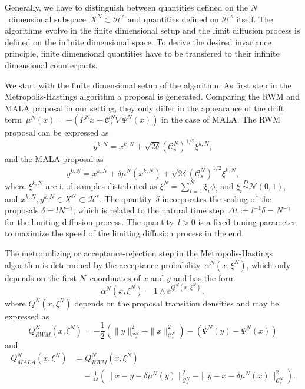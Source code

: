Generally, we have to distinguish between quantities defined on the $N$~dimensional subspace~$X^N \subset \mathcal{H}^s$ and quantities defined on $\mathcal{H}^s$ itself. The algorithms evolve in the finite dimensional setup and the limit diffusion process is defined on the infinite dimensional space. To derive the desired invariance principle, finite dimensional quantities have to be transfered to their infinite dimensional counterparts.

We start with the finite dimensional setup of the algorithm. As first step in the Metropolis-Hastings algorithm a proposal is generated. Comparing the RWM and MALA proposal in our setting, they only differ in the appearance of the drift term~$\mu^{N}(x) = - (P^{N}x + \mathcal{C}_s^{N} \nabla \Psi^{N}(x))$ in the case of MALA. The RWM proposal can be expressed as
\begin{equation}
\label{DLR-RWM-proposal short}
 y^{k,N} = x^{k,N} + \sqrt{2 \delta} (\mathcal{C}_s^{N})^{1/2} \xi^{k,N},
\end{equation}
and the MALA proposal as
\begin{equation}
\label{DLR- MALA-proposal short}
 y^{k,N} = x^{k,N} + \delta \mu^{N}(x^{k,N}) + \sqrt{2 \delta} (\mathcal{C}_s^{N})^{1/2} \xi^{k,N},
\end{equation}
where $\xi^{k,N}$ are i.i.d.\,samples distributed as $\xi^{N} = \sum_{i=1}^{N} \xi_i \phi_i$ and $\xi_i \stackrel{D}{\sim} \mathcal{N}(0,1)$, and $x^{k,N}, y^{k,N} \in X^{N} \subset \mathcal{H}^s$. The quantity~$\delta$  incorporates the scaling of the proposals $ \delta = l N^{-\gamma} $, which is related to the natural time step~$\Delta t := l^{-1} \delta = N^{ - \gamma}$ for the limiting diffusion process. The quantity~$l > 0$ is a fixed tuning parameter to maximize the speed of the limiting diffusion process in the end.

The metropolizing or acceptance-rejection step in the Metropolis-Hastings algorithm is determined by the acceptance probability~$\alpha^{N}(x, \xi^{N})$, which only depends on the first $N$~coordinates of $x$ and $y$ and has the form
\begin{equation}
 \label{DLR-acceptance probability short}
 \alpha^{N}_{\cdot} (x, \xi^{N}) = 1 \wedge e^{Q^{N}_{\cdot}(x, \xi^{N})},
\end{equation}
where $Q^{N}_{\cdot}(x, \xi^{N})$ depends on the proposal transition densities and may be expressed as
\begin{equation}
 \label{DLR-Q RWM short}
 Q_{RWM}^{N}(x, \xi^{N}) = - \frac{1}{2} \left(\| y \|_{\mathcal{C}_s^N}^2 - \| x \|_{\mathcal{C}_s^N}^2\right) - \left( \Psi^N(y) - \Psi^N(x) \right)
\end{equation}
and 
\begin{equation}
 \label{DLR-Q MALA short}
 \begin{split}
  Q_{MALA}^{N}(x, \xi^{N}) & = Q_{RWM}^{N}(x, \xi^{N}) \\
  & \quad - \frac{1}{4 \delta} \left( \| x - y - \delta \mu^N(y) \|_{\mathcal{C}_s^N}^2 -  \| y - x - \delta \mu^N(x) \|_{\mathcal{C}_s^N}^2 \right).
 \end{split}
\end{equation}

